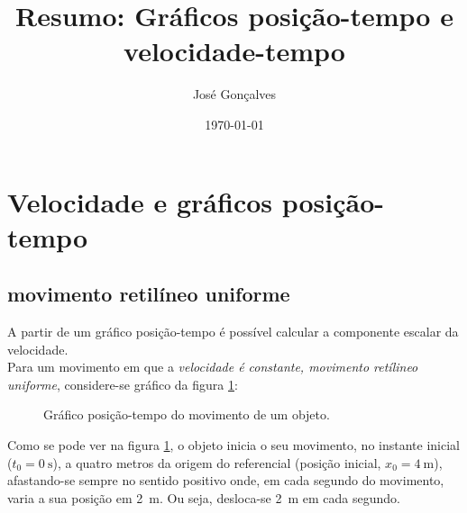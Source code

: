 \documentclass[a4paper,12pt]{article}
\title{Resumo: Gráficos posição-tempo e velocidade-tempo}
\author{José Gonçalves}
\date{\today}
\begin{document}
	\maketitle
	
	\tableofcontents
	\bigskip
	
	\section{Velocidade e gráficos posição-tempo}
	\subsection{movimento retilíneo uniforme}
	A partir de um gráfico posição-tempo é possível calcular a componente escalar da velocidade.\\
	Para um movimento em que a \emph{velocidade é constante, movimento retílineo uniforme}, considere-se gráfico da figura \ref{fig:grafx1}:
	
	
	\begin{figure}[H]
		\centering
		\caption{Gráfico posição-tempo do movimento de um objeto.}
		\label{fig:grafx1}
	\end{figure}
	
	Como se pode ver na figura \ref{fig:grafx1}, o objeto inicia o seu movimento, no instante inicial ($t_0 = \SI{0}{\second}$), a quatro metros da origem do referencial (posição inicial, $x_0 = \SI{4}{\meter}$), afastando-se sempre no sentido positivo onde, em cada segundo do movimento, varia a sua posição em \SI{2}{\meter}. Ou seja, desloca-se \SI{2}{\meter} em cada segundo.
	
\end{document}
